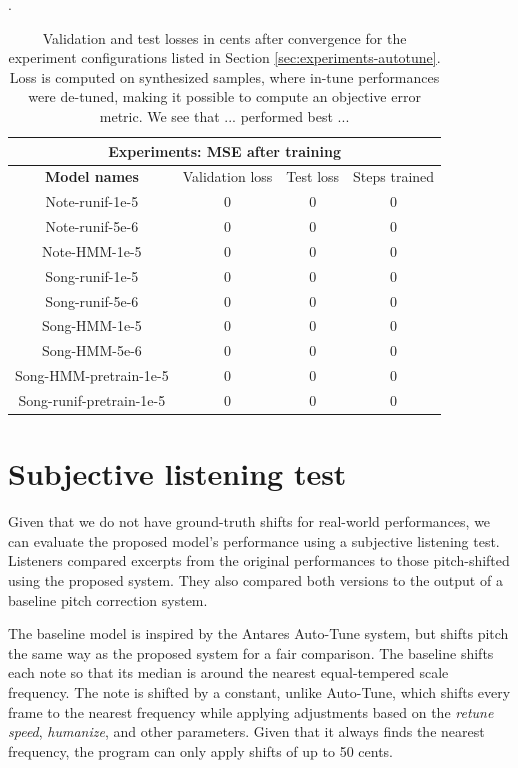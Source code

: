 \begin{table}
\centering.
\begin{tabular}{ |c|c|c|c| } 
\hline
\multicolumn{4}{|c|}{\textbf{Experiments: MSE after training}}\\
\hline\hline
\textbf{Model names} & Validation loss & Test loss & Steps trained \\
\hline\hline
Note-runif-1e-5 & 0 & 0 & 0  \\
\hline
Note-runif-5e-6 & 0 & 0 & 0  \\
\hline
Note-HMM-1e-5 & 0 & 0 & 0  \\ 
\hline
Song-runif-1e-5 & 0 & 0 & 0  \\ 
\hline
Song-runif-5e-6 & 0 & 0 & 0  \\ 
\hline
Song-HMM-1e-5 & 0 & 0 & 0  \\ 
\hline
Song-HMM-5e-6 & 0 & 0 & 0  \\ 
\hline
Song-HMM-pretrain-1e-5 & 0 & 0 & 0  \\ 
\hline
Song-runif-pretrain-1e-5 & 0 & 0 & 0  \\
\hline
\end{tabular}
\label{table:experiment-results}
\caption{Validation and test losses in cents after convergence for the experiment configurations listed in Section \ref{sec:experiments-autotune}. Loss is computed on synthesized samples, where in-tune performances were de-tuned, making it possible to compute an objective error metric. We see that ... performed best ...}
\end{table}
\section{Subjective listening test}
\label{sec:subjective-test}
Given that we do not have ground-truth shifts for real-world performances, we can evaluate the proposed model's performance using a subjective listening test. Listeners compared excerpts from the original performances to those pitch-shifted using the proposed system. They also compared both versions to the output of a baseline pitch correction system. 

The baseline model is inspired by the Antares Auto-Tune system, but shifts pitch the same way as the proposed system for a fair comparison. The baseline shifts each note so that its median is around the nearest equal-tempered scale frequency. The note is shifted by a constant, unlike Auto-Tune, which shifts every frame to the nearest frequency while applying adjustments based on the \textit{retune speed}, \textit{humanize}, and other parameters. Given that it always finds the nearest frequency, the program can only apply shifts of up to 50 cents. 

